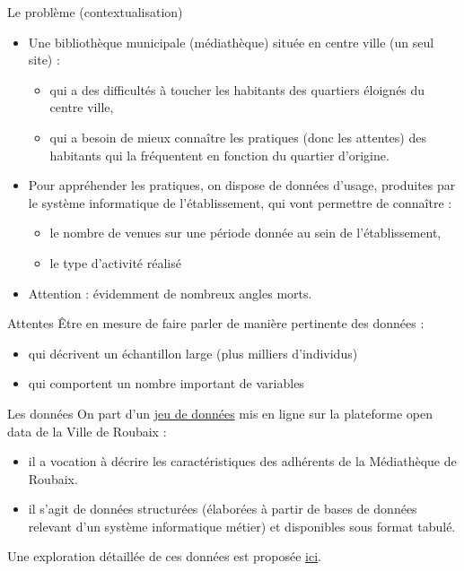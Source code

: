 \documentclass{beamer}
\begin{document}
\begin{frame}{Le problème (contextualisation)}
	\begin{itemize}
    	\item Une bibliothèque municipale (médiathèque) située en centre ville (un seul site) :
    	\begin{itemize}
    		\item qui a des difficultés à toucher les habitants des quartiers éloignés du centre ville,
    		\item qui a besoin de mieux connaître les pratiques (donc les attentes) des habitants qui la fréquentent en fonction du quartier d’origine.
    	\end{itemize}
    	\item Pour appréhender les pratiques, on dispose de données d’usage, produites par le système informatique de l’établissement, qui vont permettre de connaître :
    	\begin{itemize}
    		\item le nombre de venues sur une période donnée au sein de l’établissement,
    		\item le type d’activité réalisé
    	\end{itemize}
    	\item Attention : évidemment de nombreux angles morts.
	\end{itemize}
\end{frame}

\begin{frame}{Attentes}
	Être en mesure de faire parler de manière pertinente des données :
	\begin{itemize}
		\item qui décrivent un échantillon large (plus milliers d’individus)
		\item qui comportent un nombre important de variables
	\end{itemize}
\end{frame}

\begin{frame}{Les données}
	On part d'un \href{https://opendata.roubaix.fr/explore/dataset/caracteristiques_adherents_2018}{jeu de données} mis en ligne sur la plateforme open data de la Ville de Roubaix :
	\begin{itemize}
		\item il a vocation à décrire les caractéristiques des adhérents de la Médiathèque de Roubaix.
		\item il s'agit de données structurées (élaborées à partir de bases de données relevant d'un système informatique métier) et disponibles sous format tabulé.
	\end{itemize}
	Une exploration détaillée de ces données est proposée \href{https://github.com/ragbx/aqm/blob/master/01_presentation_donnees.ipynb}{ici}.
\end{frame}
\end{document}
